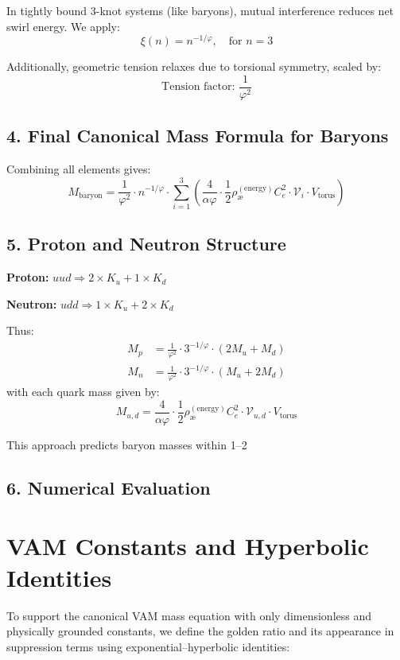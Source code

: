 \documentclass[12pt]{article}
\begin{document}
In tightly bound 3-knot systems (like baryons), mutual interference reduces net swirl energy. We apply:
\[
\xi(n) = n^{-1/\varphi}, \quad \text{for } n = 3
\]

Additionally, geometric tension relaxes due to torsional symmetry, scaled by:
\[
\text{Tension factor: } \frac{1}{\varphi^2}
\]

\subsection*{4. Final Canonical Mass Formula for Baryons}

Combining all elements gives:
\[
\boxed{
M_{\text{baryon}} = \frac{1}{\varphi^2} \cdot n^{-1/\varphi} \cdot \sum_{i=1}^{3} \left( \frac{4}{\alpha \varphi} \cdot \frac{1}{2} \rho_\text{\ae}^{(\text{energy})} C_e^2 \cdot \mathcal{V}_i \cdot V_{\text{torus}} \right)
}
\]

\subsection*{5. Proton and Neutron Structure}

\textbf{Proton:} \( uud \Rightarrow 2 \times K_u + 1 \times K_d \)

\textbf{Neutron:} \( udd \Rightarrow 1 \times K_u + 2 \times K_d \)

Thus:
\[
\begin{aligned}
M_p &= \frac{1}{\varphi^2} \cdot 3^{-1/\varphi} \cdot \left(2M_u + M_d\right) \\
M_n &= \frac{1}{\varphi^2} \cdot 3^{-1/\varphi} \cdot \left(M_u + 2M_d\right)
\end{aligned}
\]
with each quark mass given by:
\[
M_{u,d} = \frac{4}{\alpha \varphi} \cdot \frac{1}{2} \rho_\text{\ae}^{(\text{energy})} C_e^2 \cdot \mathcal{V}_{u,d} \cdot V_{\text{torus}}
\]

This approach predicts baryon masses within 1–2%


\subsection*{6. Numerical Evaluation}
\section*{VAM Constants and Hyperbolic Identities}

To support the canonical VAM mass equation with only dimensionless and physically grounded constants, we define the golden ratio and its appearance in suppression terms using exponential–hyperbolic identities:
\end{document}
